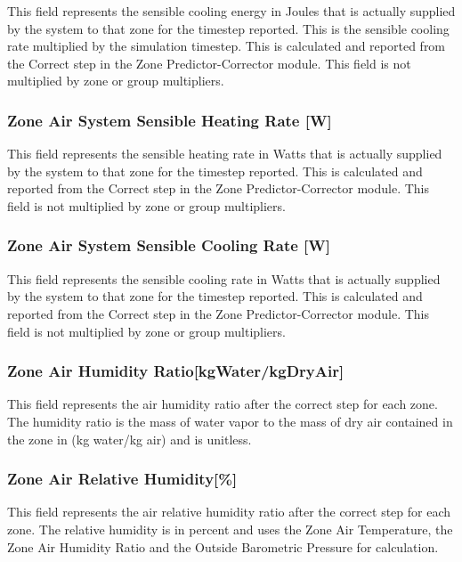 This field represents the sensible cooling energy in Joules that is actually supplied by the system to that zone for the timestep reported. This is the sensible cooling rate multiplied by the simulation timestep. This is calculated and reported from the Correct step in the Zone Predictor-Corrector module. This field is not multiplied by zone or group multipliers.

\subsubsection{Zone Air System Sensible Heating Rate {[}W{]}}\label{zone-air-system-sensible-heating-rate-w-1}

This field represents the sensible heating rate in Watts that is actually supplied by the system to that zone for the timestep reported. This is calculated and reported from the Correct step in the Zone Predictor-Corrector module. This field is not multiplied by zone or group multipliers.

\subsubsection{Zone Air System Sensible Cooling Rate {[}W{]}}\label{zone-air-system-sensible-cooling-rate-w-1}

This field represents the sensible cooling rate in Watts that is actually supplied by the system to that zone for the timestep reported. This is calculated and reported from the Correct step in the Zone Predictor-Corrector module. This field is not multiplied by zone or group multipliers.

\subsubsection{Zone Air Humidity Ratio{[}kgWater/kgDryAir{]}}\label{zone-air-humidity-ratiokgwaterkgdryair}

This field represents the air humidity ratio after the correct step for each zone. The humidity ratio is the mass of water vapor to the mass of dry air contained in the zone in (kg water/kg air) and is unitless.

\subsubsection{Zone Air Relative Humidity{[}\%{]}}\label{zone-air-relative-humidity-1}

This field represents the air relative humidity ratio after the correct step for each zone. The relative humidity is in percent and uses the Zone Air Temperature, the Zone Air Humidity Ratio and the Outside Barometric Pressure for calculation.

